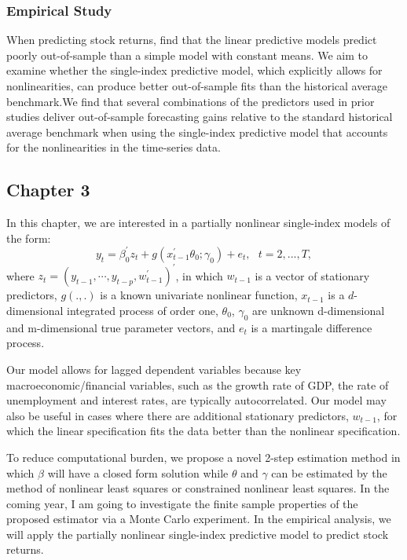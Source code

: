 \documentclass[a4paper,12pt,times,numbered,print,index]{report}
\numberwithin{equation}{section}
\begin{document}
	\subsubsection*{Empirical Study}
	When predicting stock returns, \cite{welch2008comprehensive} find that the linear predictive models predict poorly out-of-sample than a simple model with constant means. We aim to examine whether the single-index predictive model, which explicitly allows for nonlinearities, can produce better out-of-sample fits than the historical average benchmark.We find that several combinations of the predictors used in prior studies deliver out-of-sample forecasting gains relative to the standard historical average benchmark when using the single-index predictive model that accounts for the nonlinearities in the time-series data.
	
	
	\subsection*{Chapter 3}
	In this chapter, we are interested in a partially nonlinear single-index models of the form:
	$$
	y_{t} = \beta_0^{\prime} z_t + g\left( x_{t-1}^{\prime }\theta_0; \gamma_0\right) +e_{t},\ \ \
	t=2,...,T, 
	$$
	where $z_t = (y_{t-1}, \cdots, y_{t-p}, w_{t-1}^{\prime})^{\prime}$, in which $w_{t-1}$ is a vector of stationary predictors, 
	$g\left( .,.\right) $ is a known univariate nonlinear function, $x_{t-1}$ is a $d$-dimensional integrated process of order one, $\theta _{0}$, $\gamma _{0}$ are unknown d-dimensional and m-dimensional true parameter vectors, and $e_{t}$ is a martingale difference process.
	
	Our model allows for lagged dependent variables because key macroeconomic/financial variables, such as the growth rate of GDP, the rate of unemployment and interest rates, are typically autocorrelated. Our model may also be useful in cases where there are additional stationary predictors, $w_{t-1}$, for which the linear specification fits the data better than the nonlinear specification.
	
	To reduce computational burden, we propose a novel 2-step estimation method in which $\beta$ will have a closed form solution while $\theta$ and $\gamma$ can be estimated by the method of nonlinear least squares or constrained nonlinear least squares. In the coming year, I am going to investigate the finite sample properties of the proposed estimator via a Monte Carlo experiment. In the empirical analysis, we will apply the partially nonlinear single-index predictive model to predict stock returns. 
	
\end{document}
